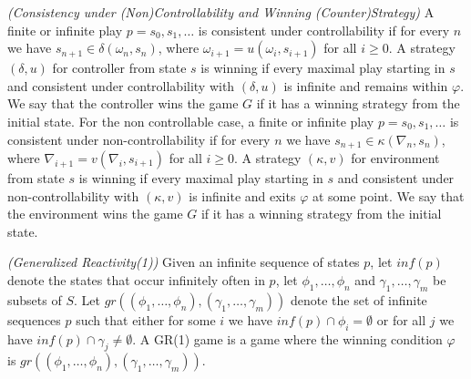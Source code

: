 \begin{definition}\label{def:consistency}\emph{(Consistency under (Non)Controllability and Winning (Counter)Strategy)}
	A finite or infinite play $p= s_0,s_1,\ldots$ is consistent under controllability if for every $n$ we have $s_{n+1} \in \delta(\omega_n,s_n)$, where $\omega_{i+1}=u(\omega_i,s_{i+1})$ for all
	$i \geq 0$. A strategy $(\delta, u)$ for controller from state $s$ is 
	winning if every maximal play starting in $s$ and consistent under controllability with $(\delta, u)$ is infinite and remains within $\varphi$.  We say that the controller wins the game $G$ if it has a winning strategy from the initial state. For the non controllable case,
	a finite or infinite play $p= s_0,s_1,\ldots$ is consistent under non-controllability if for every $n$ we have $s_{n+1} \in \kappa(\nabla_n,s_n)$, where $\nabla_{i+1}=v(\nabla_i,s_{i+1})$ for all
	$i \geq 0$. A strategy $(\kappa, v)$ for environment from state $s$ is 
	winning if every maximal play starting in $s$ and consistent under non-controllability with $(\kappa, v)$ is infinite and exits $\varphi$ at some point.  We say that the environment wins the game $G$ if it has a winning strategy from the initial state.
\end{definition}

\begin{definition}\label{def:generalized-reactivity}\emph{(Generalized Reactivity(1))}
	Given an infinite sequence of states $p$, let $inf(p)$ denote the states that occur infinitely often in $p$, let $\phi_1,\ldots,\phi_n$ and $\gamma_1,\ldots,\gamma_m$ be subsets of $S$.  Let $gr((\phi_1,\ldots,\phi_n),(\gamma_1,\ldots,\gamma_m))$ denote the set of infinite sequences $p$ such that either for some $i$ we have $inf(p) \cap \phi_i = \emptyset$ or for all $j$ we have $inf(p)\cap \gamma_j \neq \emptyset$. A GR(1) game is a game where the winning condition $\varphi$ is $gr((\phi_1,\ldots,\phi_n),(\gamma_1,\ldots,\gamma_m))$.
\end{definition}


